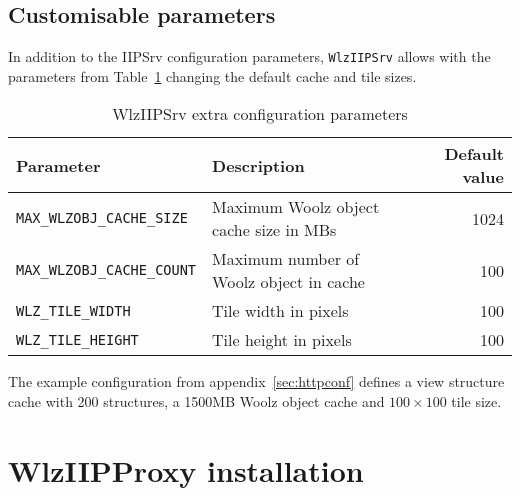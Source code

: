 \documentclass[11pt]{article}
\begin{document}
\subsection{Customisable parameters}
\label{sec:custom_param}
In addition to the IIPSrv \cite[p.25]{IIPSRV097} configuration parameters, \texttt{WlzIIPSrv} allows with the  parameters from Table~\ref{tab:parameters} changing the default cache and tile sizes.

\begin{table}[!htbp]
\centering
\begin{tabular}{|l|p{}|r|}
\hline
\textbf{Parameter}          & \textbf{Description}                        & \textbf{Default value} \\
\hline
\texttt{MAX\_WLZOBJ\_CACHE\_SIZE}        & Maximum Woolz object cache size in MBs               & 1024 \\
\texttt{MAX\_WLZOBJ\_CACHE\_COUNT}	 & Maximum number of Woolz object in cache		& 100 \\
\texttt{WLZ\_TILE\_WIDTH}                & Tile width in pixels                                 & 100  \\
\texttt{WLZ\_TILE\_HEIGHT}               & Tile height in pixels                                & 100  \\
\hline
\end{tabular}
\caption{WlzIIPSrv extra configuration parameters}
\label{tab:parameters}
\end{table}

The example configuration from appendix~\ref{sec:httpconf} defines a view
structure cache with 200 structures, a 1500MB Woolz object cache
and $100\times100$ tile size.

\section{WlzIIPProxy installation}
\label{sec:fcgi:install}
\end{document}
